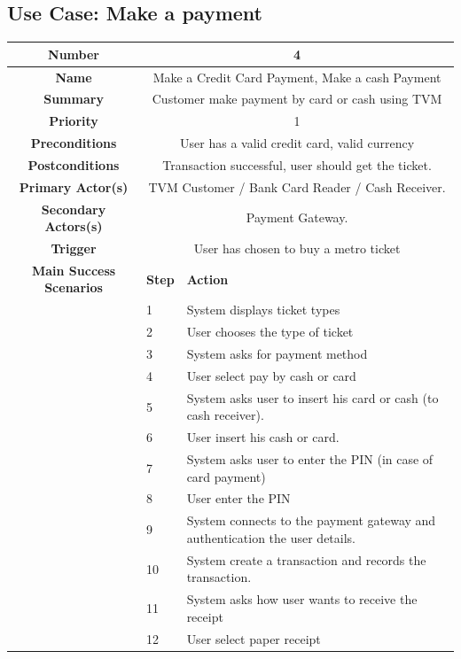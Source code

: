 \documentclass[a4paper,12pt]{report}
\begin{document}
\subsection{Use Case: Make a payment}
\begin{tabular}{ | c | p{2cm} | p{7cm} |}
	
	\hline
	\textbf{Number} & \multicolumn{2}{c|}{4}  \\
	\hline
	\textbf{Name} & \multicolumn{2}{c|}{Make a Credit Card Payment, Make a cash Payment}  \\
	\hline
	\textbf{Summary} & \multicolumn{2}{c|}{Customer make payment by card or cash using TVM}  \\
	\hline
	\textbf{Priority} & \multicolumn{2}{c|}{1}  \\
	\hline
	\textbf{Preconditions} & \multicolumn{2}{c|}{User has a valid credit card, valid currency}  \\
	\hline
	\textbf{Postconditions} & \multicolumn{2}{c|}{Transaction successful, user should get the ticket.}  \\
	\hline
	\textbf{Primary Actor(s)} & \multicolumn{2}{c|}{TVM Customer / Bank Card Reader / Cash Receiver.}  \\
	\hline
	\textbf{Secondary Actors(s)} & \multicolumn{2}{c|}{Payment Gateway.}  \\
	\hline
	\textbf{Trigger} & \multicolumn{2}{c|}{User has chosen to buy a metro ticket}  \\
	\hline
	\textbf{Main Success Scenarios} & \textbf{Step} & \textbf{Action} \\
	\hline
	& 1 & System displays ticket types \\ 
	\hline
	&  2  & User chooses the type of ticket \\
	\hline
	&  3  & System asks for payment method \\
	\hline
	&  4  & User select pay by cash or card \\
	\hline
	&  5  & System asks user to insert his card or cash (to cash receiver). \\
	\hline
	&  6  & User insert his cash or card. \\
	\hline
	&  7  & System asks user to enter the PIN (in case of card payment) \\
	\hline
	&  8  & User enter the PIN \\
	\hline
	&  9  & System connects to the payment gateway and authentication the user details. \\
	\hline
	&  10  & System create a transaction and records the transaction. \\
	\hline
	&  11  & System asks how user wants to receive the receipt \\
	\hline
	&  12  & User select paper receipt \\
	\hline
	
\end{tabular}
\end{document}
